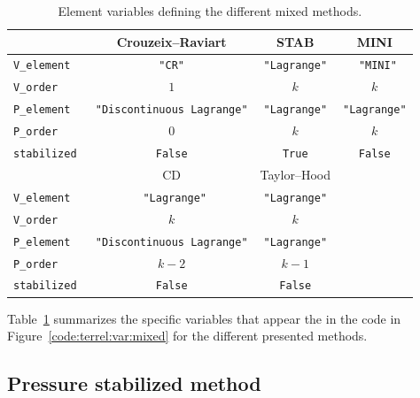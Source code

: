 \begin{table}
\centering
\caption{Element variables defining the different mixed methods.}
\label{tab:terrel:element_vars}
\medskip
\small
\begin{tabular}{|lccc|}
\hline
& Crouzeix--Raviart &  STAB & MINI \\
\hline
{\tt V\_element } & {\tt "CR"} &  {\tt "Lagrange"} & {\tt
 "MINI"}\\
{\tt V\_order} & $1$ & $k$ & $k$ \\
{\tt P\_element } & {\tt "Discontinuous Lagrange"} &  {\tt "Lagrange"} & {\tt "Lagrange"} \\
{\tt P\_order} & $0$ & $k$ & $k$ \\
{\tt stabilized } & {\tt False} & {\tt True} & {\tt False} \\
\hline
\hline
& CD &  Taylor--Hood &\\
\hline
{\tt V\_element } & {\tt
 "Lagrange"} & {\tt "Lagrange"} &\\
{\tt V\_order} & $k$ & $k$ &\\
{\tt P\_element } & {\tt "Discontinuous Lagrange"} & {\tt "Lagrange"} &\\
{\tt P\_order} & $k-2$ & $k-1$ &\\
{\tt stabilized } &  {\tt False} & {\tt False} &\\
\hline
\end{tabular}
\end{table}

Table~\ref{tab:terrel:element_vars} summarizes the specific variables
that appear the in the \ufl code in Figure~\ref{code:terrel:var:mixed}
for the different presented methods.

\subsection{Pressure stabilized method}


